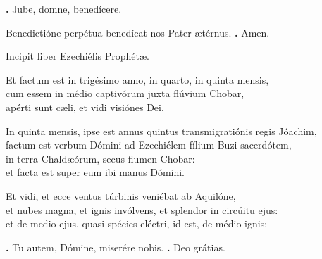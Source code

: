 \begin{small}
\textbf{\Vbar.} Jube, domne, benedícere.

Benedictióne perpétua benedícat nos Pater ætérnus. \textbf{\Rbar.} Amen.
\end{small}


Incipit liber Ezechiélis Prophétæ.

Et factum est in trigésimo anno, in quarto, in quinta mensis,\\
cum essem in médio captivórum juxta flúvium Chobar, \\
apérti sunt cæli, et vidi visiónes Dei.

In quinta mensis, ipse est annus quintus transmigratiónis regis Jóachim,\\
factum est verbum Dómini ad Ezechiélem fílium Buzi sacerdótem, \\
in terra Chaldæórum, secus flumen Chobar: \\
et facta est super eum ibi manus Dómini.

Et vidi, et ecce ventus túrbinis veniébat ab Aquilóne, \\
et nubes magna, et ignis invólvens, et splendor in circúitu ejus: \\
et de medio ejus, quasi spécies eléctri, id est, de médio ignis:

\textbf{\Vbar.} Tu autem, Dómine, miserére nobis.
\textbf{\Rbar.} Deo grátias.

